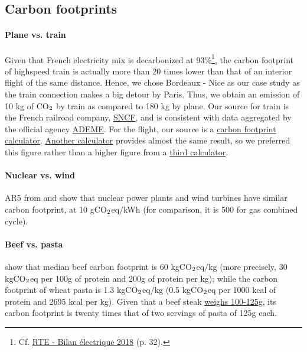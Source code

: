 \documentclass[english,5p,authoryear]{elsarticle}
\begin{document}
\begin{appendices}
\subsection{Carbon footprints\label{app:footprint}}

\paragraph{Plane vs. train}

Given that French electricity mix is decarbonized at 93\%\footnote{Cf. \href{https://www.rte-france.com/sites/default/files/be_pdf_2018v3.pdf}{RTE - Bilan électrique 2018} (p. 32).}, the carbon footprint of highspeed train is actually more than 20 times lower than that of an interior flight of the same distance. Hence, we chose Bordeaux - Nice as our case study as the train connection makes a big detour by Paris. Thus, we obtain an emission of 10 kg of CO$_\textnormal{2}$ by train as compared to 180 kg by plane. Our source for train is the French railroad company, \href{https://www.oui.sncf/aide/calcul-des-emissions-de-co2-sur-votre-trajet-en-train}{SNCF}, and is consistent with data aggregated by the official agency \href{basecarbone.fr}{ADEME}. For the flight, our source is a  \href{https://calculator.carbonfootprint.com/calculator.aspx?tab=3}{carbon footprint calculator}. \href{http://www.climatecare.org/home.aspx}{Another calculator} provides almost the same result, so we preferred this figure rather than a higher figure from a \href{https://co2.myclimate.org/fr/flight_calculators}{third calculator}.

\paragraph{Nuclear vs. wind}

AR5 from \citet{ar5_ar5_nodate} and \citet{pehl_understanding_2017} show that nuclear power plants and wind turbines have similar carbon footprint, at 10 gCO$_\textnormal{2}$eq$/$kWh (for comparison, it is 500 for gas combined cycle).

\paragraph{Beef vs. pasta}

\citet{poore_reducing_2018} show that median beef carbon footprint is 60 kgCO$_\textnormal{2}$eq$/$kg (more precisely, 30 kgCO$_\textnormal{2}$eq per 100g of protein and 200g of protein per kg); while the carbon footprint of wheat pasta is 1.3 kgCO$_\textnormal{2}$eq$/$kg (0.5 kgCO$_\textnormal{2}$eq per 1000 kcal of protein and 2695 kcal per kg). Given that a beef steak \href{http://www.lessentieldesviandes-pro.org/introduction.php}{weighs 100-125g}, its carbon footprint is twenty times that of two servings of pasta of 125g each. 


\end{appendices}
\end{document}
